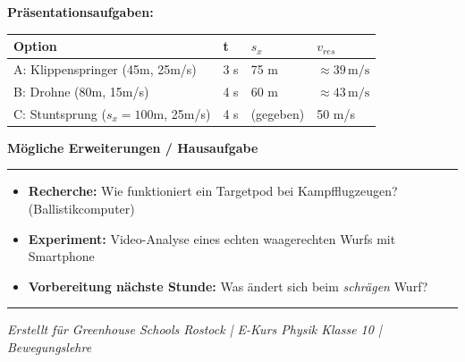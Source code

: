 \documentclass[11pt, a4paper]{article}
\newcommand{\fachfarbe}{physik}
\newcommand{\abschnitt}[1]{%
    \vspace{12pt}
    \noindent\textbf{\large\textcolor{\fachfarbe}{#1}}
    \vspace{6pt}
    \hrule
    \vspace{8pt}
}
\begin{document}
\vspace{8pt}

\textbf{Präsentationsaufgaben:}

\begin{tabular}{|p{3.5cm}|p{3cm}|p{3cm}|p{3cm}|}
\hline
\textbf{Option} & \textbf{t} & \textbf{$s_x$} & \textbf{$v_{res}$} \\
\hline
A: Klippenspringer (45m, 25m/s) & 3 s & 75 m & $\approx 39\,\text{m/s}$ \\
\hline
B: Drohne (80m, 15m/s) & 4 s & 60 m & $\approx 43\,\text{m/s}$ \\
\hline
C: Stuntsprung ($s_x=100$m, 25m/s) & 4 s & (gegeben) & 50 m/s \\
\hline
\end{tabular}


\abschnitt{Mögliche Erweiterungen / Hausaufgabe}

\begin{itemize}
    \item \textbf{Recherche:} Wie funktioniert ein Targetpod bei Kampfflugzeugen? (Ballistikcomputer)
    \item \textbf{Experiment:} Video-Analyse eines echten waagerechten Wurfs mit Smartphone
    \item \textbf{Vorbereitung nächste Stunde:} Was ändert sich beim \textit{schrägen} Wurf?
\end{itemize}


\vfill
\hrule
\vspace{4pt}
\footnotesize
\textit{Erstellt für Greenhouse Schools Rostock | E-Kurs Physik Klasse 10 | Bewegungslehre}
\end{document}
